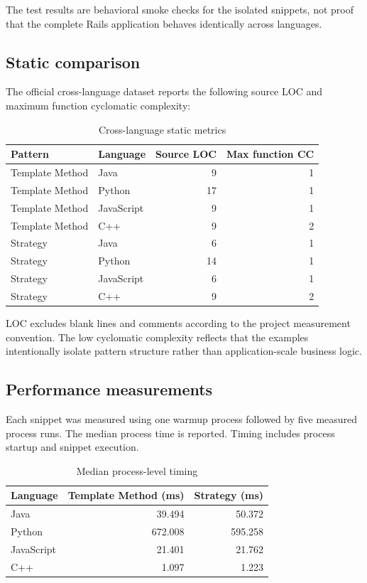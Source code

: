 \documentclass[10pt,a4paper]{article}
\begin{document}
The test results are behavioral smoke checks for the isolated snippets, not proof that the complete Rails application behaves identically across languages.

\subsection{Static comparison}

The official cross-language dataset reports the following source LOC and maximum function cyclomatic complexity:

\begin{table}[H]
\centering
\caption{Cross-language static metrics}
\label{tab:static}
\begin{tabular}{llrr}
\toprule
Pattern & Language & Source LOC & Max function CC\\
\midrule
Template Method & Java & 9 & 1\\
Template Method & Python & 17 & 1\\
Template Method & JavaScript & 9 & 1\\
Template Method & C++ & 9 & 2\\
Strategy & Java & 6 & 1\\
Strategy & Python & 14 & 1\\
Strategy & JavaScript & 6 & 1\\
Strategy & C++ & 9 & 2\\
\bottomrule
\end{tabular}
\end{table}

LOC excludes blank lines and comments according to the project measurement convention. The low cyclomatic complexity reflects that the examples intentionally isolate pattern structure rather than application-scale business logic.

\subsection{Performance measurements}

Each snippet was measured using one warmup process followed by five measured process runs. The median process time is reported. Timing includes process startup and snippet execution.

\begin{table}[H]
\centering
\caption{Median process-level timing}
\label{tab:timing}
\begin{tabular}{lrr}
\toprule
Language & Template Method (ms) & Strategy (ms)\\
\midrule
Java & 39.494 & 50.372\\
Python & 672.008 & 595.258\\
JavaScript & 21.401 & 21.762\\
C++ & 1.097 & 1.223\\
\bottomrule
\end{tabular}
\end{table}
\end{document}
